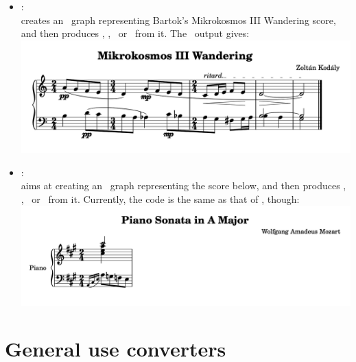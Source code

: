 \begin{itemize}
\begin{lstlisting}[language=MusicXML]
	<!-- ... ... ... -->
\end{lstlisting}


\item {}: \\
creates an \msrRepr\ graph representing Bartok's Mikrokosmos III Wandering score, and then produces \lily, \braille, \mxml\ or \guido\ from it. The \lily\ output gives:\\
\includegraphics[scale=0.7]{../graphics/Mikrokosmos_III_Wandering.png}

\item {}: \\
aims at creating an \lpsrRepr\ graph representing the score below, and then produces \lily, \braille, \mxml\ or \guido\ from it. Currently, the code is the same as that of , though:\\
\includegraphics[scale=0.7]{../graphics/LilyPondIssue34.png}
\end{itemize}


\section{General use converters}\label{General use converters}

